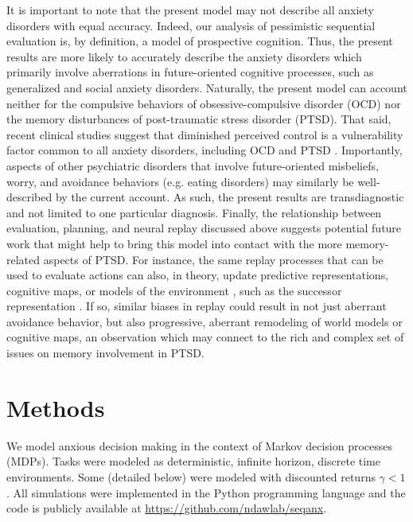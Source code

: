 \documentclass[11pt]{article} %
\begin{document}
It is important to note that the present model may not describe all anxiety disorders with equal accuracy. Indeed, our analysis of pessimistic sequential evaluation is, by definition, a model of prospective cognition. Thus, the present results are more likely to accurately describe the anxiety disorders which primarily involve aberrations in future-oriented cognitive processes, such as generalized and social anxiety disorders. Naturally, the present model can account neither for the compulsive behaviors of obsessive-compulsive disorder (OCD) nor the memory disturbances of post-traumatic stress disorder (PTSD). That said, recent clinical studies suggest that diminished perceived control is a vulnerability factor common to all anxiety disorders, including OCD and PTSD \citep{gallagher2014a, gallagher2014b}. Importantly, aspects of other psychiatric disorders that involve future-oriented misbeliefs, worry, and avoidance behaviors (e.g. eating disorders\citep{konstantellou2011}) may similarly be well-described by the current account. As such, the present results are transdiagnostic and not limited to one particular diagnosis. Finally, the relationship between evaluation, planning, and neural replay discussed above suggests potential future work that might help to bring this model into contact with the more memory-related aspects of PTSD. For instance, the same replay processes that can be used to evaluate actions can also, in theory, update predictive representations, cognitive maps, or models of the environment \citep{russek_predictive_2017}, such as the successor representation \cite{dayan1993, momennejad_successor_2017}. If so, similar biases in replay could result in not just aberrant avoidance behavior, but also progressive, aberrant remodeling of world models or cognitive maps, an observation which may connect to the rich and complex set of issues on memory involvement in PTSD.

\section{Methods}

We model anxious decision making in the context of Markov decision processes (MDPs). Tasks were modeled as deterministic, infinite horizon, discrete time environments. Some (detailed below) were modeled with discounted returns $\gamma < 1$. All simulations were implemented in the Python programming language and the code is publicly available at \url{https://github.com/ndawlab/seqanx}.
\end{document}
